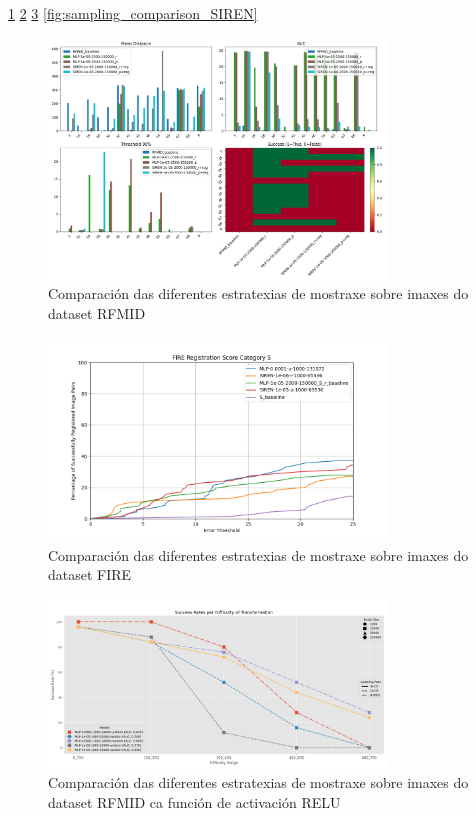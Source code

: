 \ref{fig:sampling_comparison}
\ref{fig:fire_samplingtype}
\ref{fig:sampling_comparison_relu}
\ref{fig:sampling_comparison_SIREN}
\begin{figure}[ht]
    \centering
    \includegraphics[width=0.8\textwidth]{imaxes/muestraje/RFMID_both__comp_sampling.png}
    \caption{Comparación das diferentes estratexias de mostraxe sobre imaxes do dataset RFMID}
    \label{fig:sampling_comparison}
\end{figure}

\begin{figure}[ht]
    \centering
    \includegraphics[width=0.8\textwidth]{imaxes/muestraje/fire_samplingtype.png}
    \caption{Comparación das diferentes estratexias de mostraxe sobre imaxes do dataset FIRE}
    \label{fig:fire_samplingtype}
\end{figure}


\begin{figure}[ht]
    \centering
    \includegraphics[width=0.8\textwidth]{imaxes/muestraje/experiment_plot_RFMID_MLP_RvsU.png}
    \caption{Comparación das diferentes estratexias de mostraxe sobre imaxes do dataset RFMID ca función de activación RELU}
    \label{fig:sampling_comparison_relu}
\end{figure}

